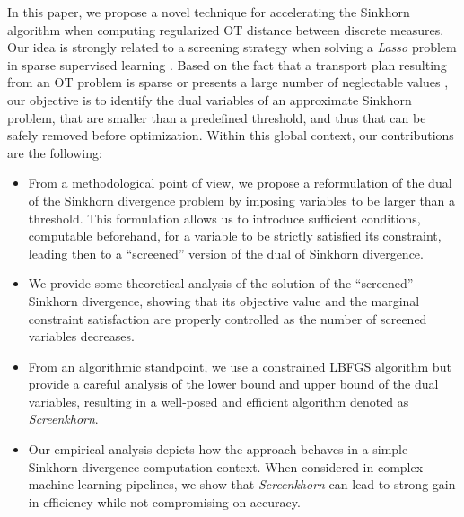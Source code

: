 {In this paper, we propose a novel technique for accelerating the Sinkhorn algorithm when computing regularized OT distance between discrete measures. Our idea
is strongly related to a screening strategy when solving a \emph{Lasso}
problem in sparse supervised learning \citep{Ghaoui2010SafeFE}. Based on the fact
that a  transport plan resulting from an OT problem is sparse or presents a large
number of neglectable values \citep{blondel2018ICML}, our objective is to identify the  dual variables of an approximate Sinkhorn problem, that are smaller than a predefined threshold, and thus that can be safely removed before optimization.  
Within this global context, our contributions are the following:
\begin{itemize}
	  \setlength\itemsep{-0.1cm}
	
	\item From a methodological point of view, we propose a reformulation of the dual of the Sinkhorn divergence problem by imposing variables to be larger than a threshold.
	This formulation allows us to introduce sufficient conditions, computable beforehand, for a variable to be strictly satisfied its constraint, leading then to
	a ``screened'' version of the dual of Sinkhorn divergence. 
	\item We provide some theoretical analysis of the solution of the ``screened''  Sinkhorn divergence, showing that its objective value and the marginal constraint satisfaction are properly controlled 	as the number of screened variables decreases.
	\item From an algorithmic standpoint, we use a constrained LBFGS algorithm \citep{nocedal1980,byrd1995L-BFGS-B} but provide a careful analysis of the lower bound and upper bound of the dual	variables, resulting in a well-posed and efficient algorithm denoted as \emph{Screenkhorn}.
	\item Our empirical analysis depicts how the approach behaves in a simple Sinkhorn divergence computation context. When considered in  complex machine learning
	pipelines, we show that \emph{Screenkhorn} can lead to strong gain in efficiency
	while not compromising on accuracy.
\end{itemize}}
%	
%


